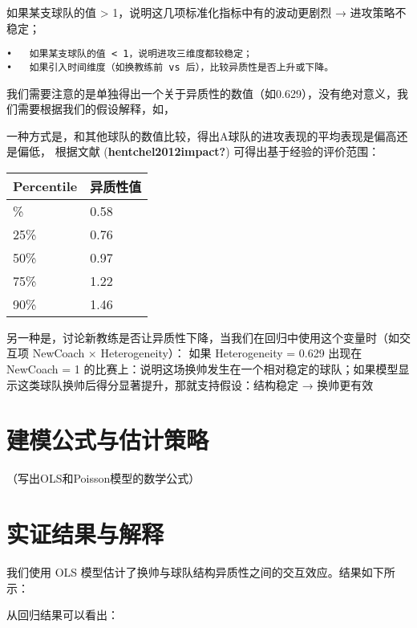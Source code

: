 \documentclass[
]{ctexart}
\begin{document}
如果某支球队的值 \textgreater{} 1，说明这几项标准化指标中有的波动更剧烈
→ 进攻策略不稳定；

\begin{verbatim}
•   如果某支球队的值 < 1，说明进攻三维度都较稳定；
•   如果引入时间维度（如换教练前 vs 后），比较异质性是否上升或下降。
\end{verbatim}

我们需要注意的是单独得出一个关于异质性的数值（如0.629），没有绝对意义，我们需要根据我们的假设解释，如，

一种方式是，和其他球队的数值比较，得出A球队的进攻表现的平均表现是偏高还是偏低，
根据文献 (\textbf{hentchel2012impact?}) 可得出基于经验的评价范围：

\begin{longtable}[]{@{}ll@{}}
\toprule\noalign{}
Percentile & 异质性值 \\
\midrule\noalign{}
\endhead
\bottomrule\noalign{}
\endlastfoot
10\% & 0.58 \\
25\% & 0.76 \\
50\% & 0.97 \\
75\% & 1.22 \\
90\% & 1.46 \\
\end{longtable}

另一种是，讨论新教练是否让异质性下降，当我们在回归中使用这个变量时（如交互项
NewCoach × Heterogeneity）： 如果 Heterogeneity = 0.629 出现在 NewCoach
= 1
的比赛上：说明这场换帅发生在一个相对稳定的球队；如果模型显示这类球队换帅后得分显著提升，那就支持假设：结构稳定
→ 换帅更有效

\section{建模公式与估计策略}\label{ux5efaux6a21ux516cux5f0fux4e0eux4f30ux8ba1ux7b56ux7565}

（写出OLS和Poisson模型的数学公式）

\section{实证结果与解释}\label{ux5b9eux8bc1ux7ed3ux679cux4e0eux89e3ux91ca}

我们使用 OLS
模型估计了换帅与球队结构异质性之间的交互效应。结果如下所示：

从回归结果可以看出：
\end{document}
